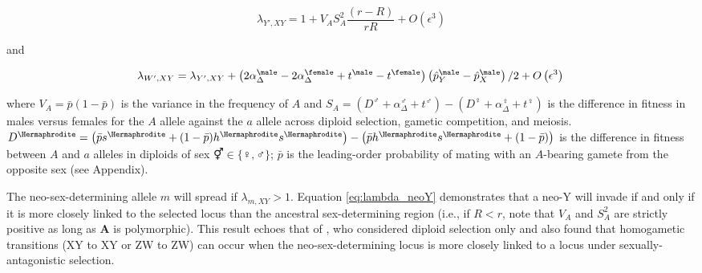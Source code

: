 \documentclass[12pt]{article}
\begin{document}
\begin{equation}
\lambda_{Y',XY} =1+ V_{A}S_{A}^2\frac{ \left( r-R \right) }{r R}+O\left(\epsilon^3 \right) 
\label{eq:lambda_neoY}
\end{equation}

\noindent 
and 

\begin{equation}
\lambda_{W',XY} =\lambda_{Y',XY}+\left(2\alpha_{\Delta}^\male-2\alpha_{\Delta}^\female+t^\male-t^\female \right) \left( \hat{p}^\male_Y-\hat{p}^\male_X \right)/2
+O\left(\epsilon^3 \right) \\
\label{eq:lambda_neoW}
\end{equation}

\noindent
where $V_{A}=\bar{p}(1-\bar{p})$ is the variance in the frequency of $A$ and $S_{A}=(D^\male +\alpha_{\Delta}^\male+t^\male) - (D^\female+\alpha_{\Delta}^\female+t^\female)$ is the difference in fitness in males versus females for the $A$ allele against the $a$ allele across diploid selection, gametic competition, and meiosis. 
$D^\Hermaphrodite=\big{(} \bar{p}s^\Hermaphrodite+(1-\bar{p})h^\Hermaphrodite s^\Hermaphrodite\big{)} -\big{(} \bar{p}h^\Hermaphrodite s^\Hermaphrodite+(1-\bar{p}) \big{)}$ is the difference in fitness between $A$ and $a$ alleles in diploids of sex $\Hermaphrodite \in \{\female,\male\}$; $\bar{p}$ is the leading-order probability of mating with an $A$-bearing gamete from the opposite sex (see Appendix). 


The neo-sex-determining allele $m$ will spread if $\lambda_{m,XY}>1$. 
Equation \eqref{eq:lambda_neoY} demonstrates that a neo-Y will invade if and only if it is more closely linked to the selected locus than the ancestral sex-determining region (i.e., if $R<r$, note that $V_{A}$ and $S_{A}^2$ are strictly positive as long as \textbf{A} is polymorphic). 
This result echoes that of \citet{vanDoorn:2007eu}, who considered diploid selection only and also found that homogametic transitions (XY to XY or ZW to ZW) can occur when the neo-sex-determining locus is more closely linked to a locus under sexually-antagonistic selection. 
\end{document}
